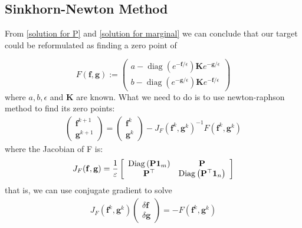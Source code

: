 \documentclass{article}
\begin{document}
\subsection{Sinkhorn-Newton Method}
From \ref{solution for P} and \ref{solution for marginal} we can conclude that our target could be reformulated as finding a zero point of

\begin{displaymath}
F(\mathbf { f },\mathbf { g}) :=
\left( \begin{array}{c}
a -  \operatorname { diag } (   e ^ { -\mathbf { f }  / \epsilon } ) \mathbf { K }  e ^ { -\mathbf { g }  / \epsilon } \\
b -  \operatorname { diag } (   e ^ { -\mathbf { g }  / \epsilon } ) \mathbf { K }  e ^ { -\mathbf { f }  / \epsilon }
\end{array} \right)
\end{displaymath}
where $a,b,\epsilon$ and $\mathbf { K}$ are known.
What we need to do is to use newton-raphson method to find its zero points:
\begin{align}
\left( \begin{array} { l } { \mathbf { f }^ { k + 1 } } \\ { \mathbf { g } ^ { k + 1 } } \end{array} \right) = \left( \begin{array} { l } { \mathbf { f } ^ { k } } \\ { \mathbf { g } ^ { k } } \end{array} \right) - J _ { F } \left( \mathbf { f } ^ { k } , \mathbf { g } ^ { k } \right) ^ { - 1 } F \left( \mathbf { f } ^ { k } , \mathbf { g } ^ { k } \right)
\end{align}
where the Jacobian of F is:
\begin{align}
J _ { F } ( \mathbf { f }  ,  \mathbf { g } ) = \frac { 1 } { \varepsilon } \left[ \begin{array} { c c } { \operatorname { Diag } \left( \mathbf{P} \mathbf { 1 } _ { m } \right) } & { \mathbf{P} } \\ { \mathbf{P} ^ { \top } } & { \operatorname { Diag } \left( \mathbf{P} ^ { \top } \mathbf { 1 } _ { n } \right) } \end{array} \right]
\end{align}
that is, we can use conjugate gradient to solve
\begin{align}
J _ { F } \left(  \mathbf {f} ^ { k } ,  \mathbf {g} ^ { k } \right) \left( \begin{array} { c } { \delta  \mathbf {f} } \\ { \delta  \mathbf {g} } \end{array} \right) = - F \left(  \mathbf {f} ^ { k } ,  \mathbf {g} ^ { k } \right)
\end{align}
\end{document}
